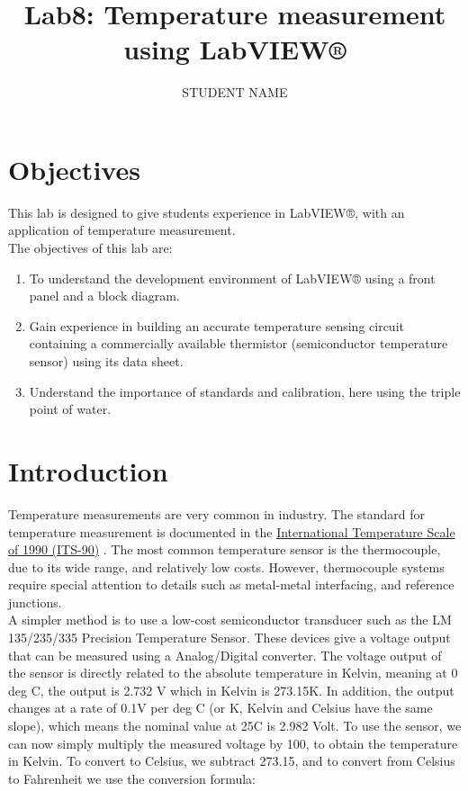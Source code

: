 \documentclass[11pt,letterpaper]{article}
\author{STUDENT NAME}
\title{Lab8: Temperature measurement using LabVIEW®}
\begin{document}
\maketitle

\section{Objectives}

This lab is designed to give students experience in LabVIEW®, with an application of temperature measurement.\\

The objectives of this lab are:\\

\begin{enumerate}
\item To understand the development environment of LabVIEW® using a front panel and a block diagram.
\item Gain experience in building an accurate temperature sensing circuit containing a commercially available thermistor (semiconductor temperature sensor) using its data sheet.
\item Understand the importance of standards and calibration, here using the triple point of water.
\end{enumerate}

\section{Introduction}
Temperature measurements are very common in industry. The standard for temperature measurement is documented in the \href{http://en.wikipedia.org/wiki/International_Temperature_Scale_of_1990}{International Temperature Scale of 1990 (ITS-90)} . The most common temperature sensor is the thermocouple, due to its wide range, and relatively low costs. However, thermocouple systems require special attention to details such as metal-metal interfacing, and reference junctions.\\

A simpler method is to use a low-cost semiconductor transducer such as the LM 135/235/335 Precision Temperature Sensor. These devices give a voltage output that can be measured using a Analog/Digital converter. The voltage output of the sensor is directly related to the absolute temperature in Kelvin, meaning at 0 deg C, the output is 2.732 V which in Kelvin is 273.15K. In addition, the output changes at a rate of 0.1V per deg C (or K, Kelvin and Celsius have the same slope), which means the nominal value at 25C is 2.982 Volt. To use the sensor, we can now simply multiply the measured voltage by 100, to obtain the temperature in Kelvin. To convert to Celsius, we subtract 273.15, and to convert from Celsius to Fahrenheit we use the conversion formula:\\
\end{document}

